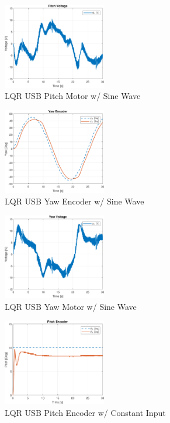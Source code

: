 \documentclass[letterpaper, 10pt, conference]{ieeeconf}
\begin{document}
\begin{figure}
  \centering
  \includegraphics[width=0.4\textwidth]{figs/matlab/LQR/Pitch_Volt_LQR_USB_SIN}
  \caption{LQR USB Pitch Motor w/ Sine Wave}
  \label{fig:Pitch_Volt_LQR_USB_SIN}
\end{figure}

\begin{figure}
  \centering
  \includegraphics[width=0.4\textwidth]{figs/matlab/LQR/Yaw_Pos_LQR_USB_SIN}
  \caption{LQR USB Yaw Encoder w/ Sine Wave}
  \label{fig:Yaw_Pos_LQR_USB_SIN}
\end{figure}

\begin{figure}
  \centering
  \includegraphics[width=0.4\textwidth]{figs/MATLAB/LQR/Yaw_Volt_LQR_USB_SIN}
  \caption{LQR USB Yaw Motor w/ Sine Wave}
  \label{fig:Yaw_Volt_LQR_USB_SIN}
\end{figure}

\begin{figure}
  \centering
  \includegraphics[width=0.4\textwidth]{figs/matlab/LQR/Pitch_Pos_LQR_USB_CON}
  \caption{LQR USB Pitch Encoder w/ Constant Input}
  \label{fig:Pitch_Pos_LQR_USB_CON}
\end{figure}
\end{document}

